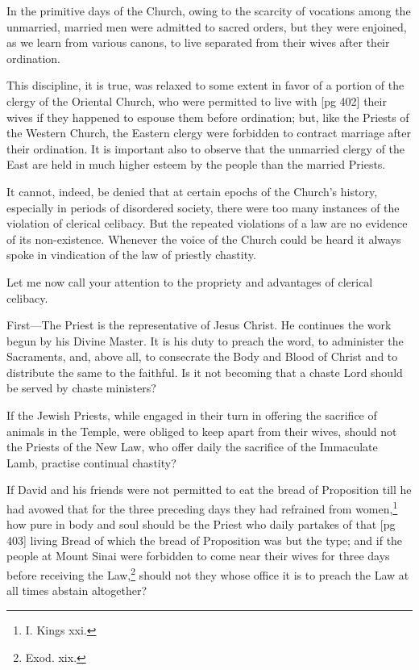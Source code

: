 In the primitive days of the Church, owing to the
scarcity of vocations among the unmarried, married
men were admitted to sacred orders, but they
were enjoined, as we learn from various canons,
to live separated from their wives after their
ordination.

This discipline, it is true, was relaxed to some
extent in favor of a portion of the clergy of the
Oriental Church, who were permitted to live with
[pg 402]
their wives if they happened to espouse them before
ordination; but, like the Priests of the Western
Church, the Eastern clergy were forbidden to
contract marriage after their ordination. It is
important also to observe that the unmarried
clergy of the East are held in much higher esteem
by the people than the married Priests.

It cannot, indeed, be denied that at certain
epochs of the Church's history, especially in
periods of disordered society, there were too many
instances of the violation of clerical celibacy. But
the repeated violations of a law are no evidence of
its non-existence. Whenever the voice of the
Church could be heard it always spoke in vindication
of the law of priestly chastity.

Let me now call your attention to the propriety
and advantages of clerical celibacy.

First—The Priest is the representative of Jesus
Christ. He continues the work begun by his
Divine Master. It is his duty to preach the word,
to administer the Sacraments, and, above all, to
consecrate the Body and Blood of Christ and to
distribute the same to the faithful. Is it not becoming
that a chaste Lord should be served by
chaste ministers?

If the Jewish Priests, while engaged in their
turn in offering the sacrifice of animals in the
Temple, were obliged to keep apart from their
wives, should not the Priests of the New Law, who
offer daily the sacrifice of the Immaculate Lamb,
practise continual chastity?

If David and his friends were not permitted to
eat the bread of Proposition till he had avowed
that for the three preceding days they had refrained
from women,\footnote{I. Kings xxi.} how pure in body and soul
should be the Priest who daily partakes of that
[pg 403]
living Bread of which the bread of Proposition
was but the type; and if the people at Mount Sinai
were forbidden to come near their wives for three
days before receiving the Law,\footnote{Exod. xix.} should not they
whose office it is to preach the Law at all times
abstain altogether?

